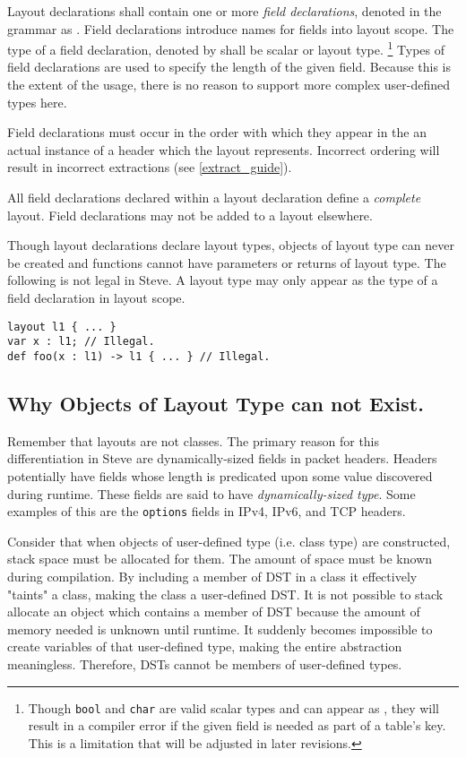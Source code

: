 Layout declarations shall contain one or more \textit{field declarations}, denoted in the grammar as . Field declarations introduce names for fields into layout scope. The type of a field declaration, denoted by  shall be scalar or layout type. \footnote{Though \texttt{bool} and \texttt{char} are valid scalar types and can appear as , they will result in a compiler error if the given field is needed as part of a table's key. This is a limitation that will be adjusted in later revisions.} Types of field declarations are used to specify the length of the given field. Because this is the extent of the usage, there is no reason to support more complex user-defined types here.

Field declarations must occur in the order with which they appear in the an actual instance of a header which the layout represents. Incorrect ordering will result in incorrect extractions (see \ref{extract_guide}).

All field declarations declared within a layout declaration define a \textit{complete} layout. Field declarations may not be added to a layout elsewhere.

Though layout declarations declare layout types, objects of layout type can never be created and functions cannot have parameters or returns of layout type. The following is not legal in Steve. A layout type may only appear as the type of a field declaration in layout scope.

\begin{minip}
\begin{lstlisting}
layout l1 { ... }
var x : l1; // Illegal.
def foo(x : l1) -> l1 { ... } // Illegal.
\end{lstlisting}
\end{minip}

\subsection{Why Objects of Layout Type can not Exist.}

Remember that layouts are not classes. The primary reason for this differentiation in Steve are dynamically-sized fields in packet headers. Headers potentially have fields whose length is predicated upon some value discovered during runtime. These fields are said to have \textit{dynamically-sized type}. Some examples of this are the \texttt{options} fields in IPv4, IPv6, and TCP headers.

Consider that when objects of user-defined type (i.e. class type) are constructed, stack space must be allocated for them. The amount of space must be known during compilation. By including a member of DST in a class it effectively "taints" a class, making the class a user-defined DST. It is not possible to stack allocate an object which contains a member of DST because the amount of memory needed is unknown until runtime. It suddenly becomes impossible to create variables of that user-defined type, making the entire abstraction meaningless. Therefore, DSTs cannot be members of user-defined types.

